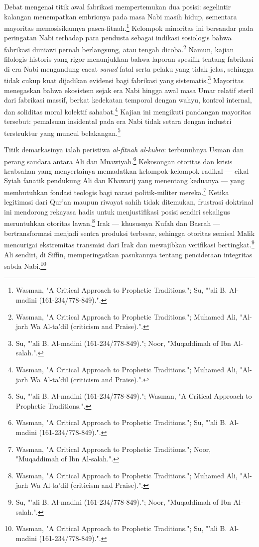 Debat mengenai titik awal fabrikasi mempertemukan dua posisi: segelintir kalangan menempatkan embrionya pada masa Nabi masih hidup, sementara mayoritas memosisikannya pasca-fitnah.\footnote{Wasman, "A Critical Approach to Prophetic Traditions."; Su, "'ali B. Al-madini (161-234/778-849).".} Kelompok minoritas ini bersandar pada peringatan Nabi terhadap para pendusta sebagai indikasi sosiologis bahwa fabrikasi duniawi pernah berlangsung, atau tengah dicoba.\footnote{Wasman, "A Critical Approach to Prophetic Traditions."; Muhamed Ali, "Al-jarh Wa Al-ta'dil (criticism and Praise).".} Namun, kajian filologis-historis yang rigor menunjukkan bahwa laporan spesifik tentang fabrikasi di era Nabi mengandung cacat \textit{sanad} fatal serta pelaku yang tidak jelas, sehingga tidak cukup kuat dijadikan evidensi bagi fabrikasi yang sistematis.\footnote{Su, "'ali B. Al-madini (161-234/778-849)."; Noor, "Muqaddimah of Ibn Al-salah.".} Mayoritas menegaskan bahwa ekosistem sejak era Nabi hingga awal masa Umar relatif steril dari fabrikasi massif, berkat kedekatan temporal dengan wahyu, kontrol internal, dan soliditas moral kolektif sahabat.\footnote{Wasman, "A Critical Approach to Prophetic Traditions."; Muhamed Ali, "Al-jarh Wa Al-ta'dil (criticism and Praise).".} Kajian ini mengikuti pandangan mayoritas tersebut: pemalsuan insidental pada era Nabi tidak setara dengan industri terstruktur yang muncul belakangan.\footnote{Su, "'ali B. Al-madini (161-234/778-849)."; Wasman, "A Critical Approach to Prophetic Traditions.".}

Titik demarkasinya ialah peristiwa \textit{al-fitnah al-kubra}: terbunuhnya Usman dan perang saudara antara Ali dan Muawiyah.\footnote{Wasman, "A Critical Approach to Prophetic Traditions."; Su, "'ali B. Al-madini (161-234/778-849).".} Kekosongan otoritas dan krisis keabsahan yang menyertainya memadatkan kelompok-kelompok radikal --- cikal Syiah fanatik pendukung Ali dan Khawarij yang menentang keduanya --- yang membutuhkan fondasi teologis bagi narasi politik-militer mereka.\footnote{Wasman, "A Critical Approach to Prophetic Traditions."; Noor, "Muqaddimah of Ibn Al-salah.".} Ketika legitimasi dari Qur'an maupun riwayat sahih tidak ditemukan, frustrasi doktrinal ini mendorong rekayasa hadis untuk menjustifikasi posisi sendiri sekaligus meruntuhkan otoritas lawan.\footnote{Wasman, "A Critical Approach to Prophetic Traditions."; Muhamed Ali, "Al-jarh Wa Al-ta'dil (criticism and Praise).".} Irak --- khususnya Kufah dan Basrah --- bertransformasi menjadi sentra produksi terbesar, sehingga otoritas semisal Malik mencurigai ekstremitas transmisi dari Irak dan mewajibkan verifikasi bertingkat.\footnote{Su, "'ali B. Al-madini (161-234/778-849)."; Noor, "Muqaddimah of Ibn Al-salah.".} Ali sendiri, di Siffin, memperingatkan pasukannya tentang pencideraan integritas sabda Nabi.\footnote{Wasman, "A Critical Approach to Prophetic Traditions."; Su, "'ali B. Al-madini (161-234/778-849).".}


